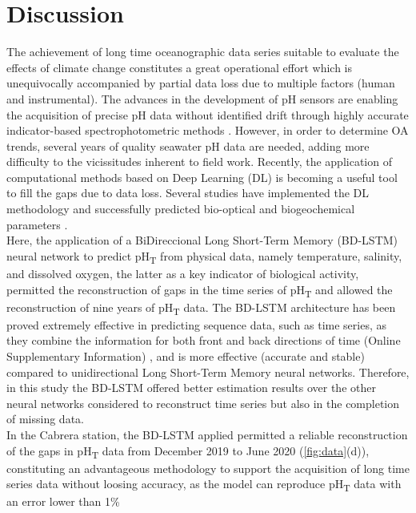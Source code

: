 \section{Discussion}
The achievement of long time oceanographic data series suitable to evaluate
the effects of climate change constitutes a great operational effort which is
unequivocally accompanied by partial data loss due to multiple factors (human
and instrumental). The advances in the development of pH sensors are enabling
the acquisition of precise pH data without identified drift through highly
accurate indicator-based spectrophotometric methods \cite{seidel2008sensor}.
However, in order to determine OA trends, several years of quality seawater pH
data are needed, adding more difficulty to the vicissitudes inherent to field
work. Recently, the application of computational methods based on Deep Learning
(DL) is becoming a useful tool to fill the gaps due to data loss. Several
studies have implemented the DL methodology and successfully predicted
bio-optical and biogeochemical parameters
\cite{Bittig2018,Broullon2019,Broullon2021,Contractor2021,gregor2019comparative,lefevre2005comparison,Li2020nn,sauzede2017estimates,velo2013total}.
\\
Here, the application of a BiDireccional Long Short-Term Memory (BD-LSTM)
neural network to predict pH\textsubscript{T} from physical data, namely
temperature, salinity, and dissolved oxygen, the latter as a key indicator of
biological activity, permitted the reconstruction of gaps in the time series of
pH\textsubscript{T} and allowed the reconstruction of nine years of
pH\textsubscript{T} data. The BD-LSTM architecture has been proved extremely
effective in predicting sequence data, such as time series, as they combine the
information for both front and back directions of time
(Online Supplementary Information) \cite{graves2005}, and is more effective
(accurate
and stable) compared to unidirectional Long Short-Term Memory neural networks.
Therefore, in this study the BD-LSTM offered better estimation results over the
other neural networks considered to reconstruct time series but also in the
completion of missing data.\\
In the Cabrera station, the BD-LSTM applied permitted a reliable
reconstruction of the gaps in pH\textsubscript{T} data from December 2019 to
June 2020 (\cref{fig:data}(d)), constituting an advantageous methodology to
support the acquisition of long time series data without loosing accuracy, as
the model can reproduce pH\textsubscript{T} data with an error lower than 1\%
